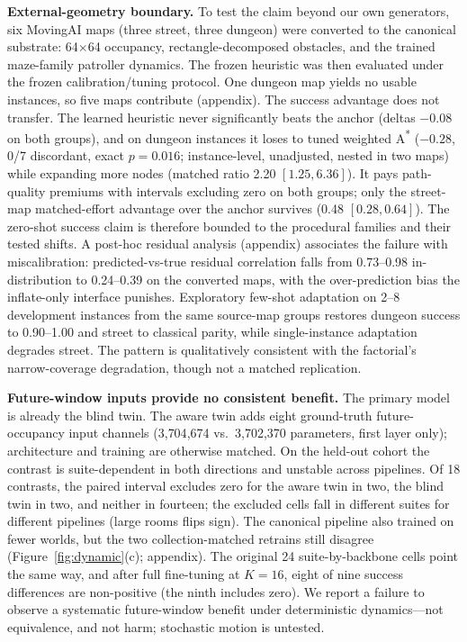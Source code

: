 \documentclass[letterpaper]{article} %
\begin{document}
\textbf{External-geometry boundary.} To test the claim beyond our own generators, six MovingAI maps \citep{sturtevant2012movingai} (three street, three dungeon) were converted to the canonical substrate: 64$\times$64 occupancy, rectangle-decomposed obstacles, and the trained maze-family patroller dynamics. The frozen heuristic was then evaluated under the frozen calibration/tuning protocol. One dungeon map yields no usable instances, so five maps contribute (appendix). The success advantage does not transfer. The learned heuristic never significantly beats the anchor (deltas $-0.08$ on both groups), and on dungeon instances it loses to tuned weighted A\textsuperscript{*} ($-0.28$, 0/7 discordant, exact $p{=}0.016$; instance-level, unadjusted, nested in two maps) while expanding more nodes (matched ratio 2.20 $[1.25, 6.36]$). It pays path-quality premiums with intervals excluding zero on both groups; only the street-map matched-effort advantage over the anchor survives (0.48 $[0.28, 0.64]$). The zero-shot success claim is therefore bounded to the procedural families and their tested shifts. A post-hoc residual analysis (appendix) associates the failure with miscalibration: predicted-vs-true residual correlation falls from 0.73--0.98 in-distribution to 0.24--0.39 on the converted maps, with the over-prediction bias the inflate-only interface punishes. Exploratory few-shot adaptation on 2--8 development instances from the same source-map groups restores dungeon success to 0.90--1.00 and street to classical parity, while single-instance adaptation degrades street. The pattern is qualitatively consistent with the factorial's narrow-coverage degradation, though not a matched replication.

\textbf{Future-window inputs provide no consistent benefit.} The primary model is already the blind twin. The aware twin adds eight ground-truth future-occupancy input channels (3{,}704{,}674 vs.\ 3{,}702{,}370 parameters, first layer only); architecture and training are otherwise matched. On the held-out cohort the contrast is suite-dependent in both directions and unstable across pipelines. Of 18 contrasts, the paired interval excludes zero for the aware twin in two, the blind twin in two, and neither in fourteen; the excluded cells fall in different suites for different pipelines (large rooms flips sign). The canonical pipeline also trained on fewer worlds, but the two collection-matched retrains still disagree (Figure~\ref{fig:dynamic}(c); appendix). The original 24 suite-by-backbone cells point the same way, and after full fine-tuning at $K{=}16$, eight of nine success differences are non-positive (the ninth includes zero). We report a failure to observe a systematic future-window benefit under deterministic dynamics---not equivalence, and not harm; stochastic motion is untested.
\end{document}
